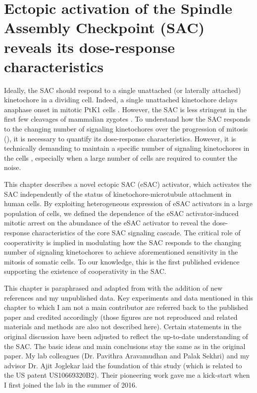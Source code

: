\chapter{Ectopic activation of the Spindle Assembly Checkpoint (SAC) reveals its dose-response characteristics}
\label{chpt2}

Ideally, the SAC should respond to a single unattached (or laterally attached) kinetochore in a dividing cell. Indeed, a single unattached kinetochore delays anaphase onset in mitotic PtK1 cells \cite{PtK1SingleUnattachedKT}. However, the SAC is less stringent in the first few cleavages of mammalian zygotes \cite{MouseEmbryoSAC, ParentalGenomeUnification}. To understand how the SAC responds to the changing number of signaling kinetochores over the progression of mitosis (), it is necessary to quantify its dose-response characteristics. However, it is technically demanding to maintain a specific number of signaling kinetochores in the cells \cite{Ablation}, especially when a large number of cells are required to counter the noise.

This chapter describes a novel ectopic SAC (eSAC) activator, which activates the SAC independently of the status of kinetochore-microtubule attachment in human cells. By exploiting heterogeneous expression of eSAC activators in a large population of cells, we defined the dependence of the eSAC activator-induced mitotic arrest on the abundance of the eSAC activator to reveal the dose-response characteristics of the core SAC signaling cascade. The critical role of cooperativity is implied in modulating how the SAC responds to the changing number of signaling kinetochores to achieve aforementioned sensitivity in the mitosis of somatic cells. To our knowledge, this is the first published evidence supporting the existence of cooperativity in the SAC.

This chapter is paraphrased and adapted from \cite{eSAC} with the addition of new references and my unpublished data. Key experiments and data mentioned in this chapter to which I am not a main contributor are referred back to the published paper and credited accordingly (those figures are not reproduced and related materials and methods are also not described here). Certain statements in the original discussion have been adjusted to reflect the up-to-date understanding of the SAC. The basic ideas and main conclusions stay the same as in the original paper. My lab colleagues (Dr. Pavithra Aravamudhan and Palak Sekhri) and my advisor Dr. Ajit Joglekar laid the foundation of this study (which is related to the US patent US10669320B2). Their pioneering work gave me a kick-start when I first joined the lab in the summer of 2016. %

